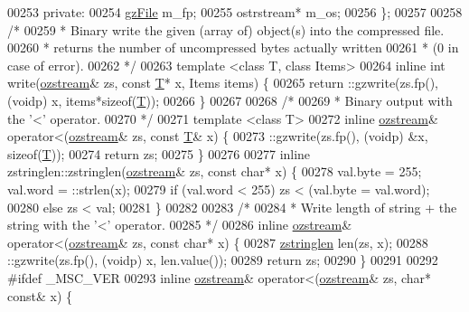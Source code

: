 \begin{DoxyCode}
00253     \textcolor{keyword}{private}:
00254         \hyperlink{structgz_file__s}{gzFile} m\_fp;
00255         ostrstream* m\_os;
00256 \};
00257 
00258 \textcolor{comment}{/*}
00259 \textcolor{comment}{ * Binary write the given (array of) object(s) into the compressed file.}
00260 \textcolor{comment}{ * returns the number of uncompressed bytes actually written}
00261 \textcolor{comment}{ * (0 in case of error).}
00262 \textcolor{comment}{ */}
00263 \textcolor{keyword}{template} <\textcolor{keyword}{class} T, \textcolor{keyword}{class} Items>
00264 \textcolor{keyword}{inline} \textcolor{keywordtype}{int} write(\hyperlink{classozstream}{ozstream}& zs, \textcolor{keyword}{const} \hyperlink{group___sparse_core___module_class_eigen_1_1_triplet}{T}* x, Items items) \{
00265     return ::gzwrite(zs.fp(), (voidp) x, items*\textcolor{keyword}{sizeof}(\hyperlink{group___sparse_core___module_class_eigen_1_1_triplet}{T}));
00266 \}
00267 
00268 \textcolor{comment}{/*}
00269 \textcolor{comment}{ * Binary output with the '<' operator.}
00270 \textcolor{comment}{ */}
00271 \textcolor{keyword}{template} <\textcolor{keyword}{class} T>
00272 \textcolor{keyword}{inline} \hyperlink{classozstream}{ozstream}& operator<(\hyperlink{classozstream}{ozstream}& zs, \textcolor{keyword}{const} \hyperlink{group___sparse_core___module_class_eigen_1_1_triplet}{T}& x) \{
00273     ::gzwrite(zs.fp(), (voidp) &x, \textcolor{keyword}{sizeof}(\hyperlink{group___sparse_core___module_class_eigen_1_1_triplet}{T}));
00274     \textcolor{keywordflow}{return} zs;
00275 \}
00276 
00277 \textcolor{keyword}{inline} zstringlen::zstringlen(\hyperlink{classozstream}{ozstream}& zs, \textcolor{keyword}{const} \textcolor{keywordtype}{char}* x) \{
00278     val.byte = 255;  val.word = ::strlen(x);
00279     \textcolor{keywordflow}{if} (val.word < 255) zs < (val.byte = val.word);
00280     \textcolor{keywordflow}{else} zs < val;
00281 \}
00282 
00283 \textcolor{comment}{/*}
00284 \textcolor{comment}{ * Write length of string + the string with the '<' operator.}
00285 \textcolor{comment}{ */}
00286 \textcolor{keyword}{inline} \hyperlink{classozstream}{ozstream}& operator<(\hyperlink{classozstream}{ozstream}& zs, \textcolor{keyword}{const} \textcolor{keywordtype}{char}* x) \{
00287     \hyperlink{classzstringlen}{zstringlen} len(zs, x);
00288     ::gzwrite(zs.fp(), (voidp) x, len.value());
00289     \textcolor{keywordflow}{return} zs;
00290 \}
00291 
00292 \textcolor{preprocessor}{#ifdef \_MSC\_VER}
00293 \textcolor{keyword}{inline} \hyperlink{classozstream}{ozstream}& operator<(\hyperlink{classozstream}{ozstream}& zs, \textcolor{keywordtype}{char}* \textcolor{keyword}{const}& x) \{

\end{DoxyCode}
